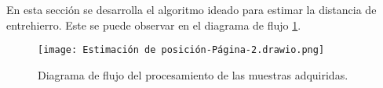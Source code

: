 En esta sección se desarrolla el algoritmo ideado para estimar la distancia de entrehierro. Este se puede observar en el diagrama de flujo \ref{fig:procesamiento-muestras-adquiridas}.


\begin{figure}[H]
	\centering
	\texttt{[image: Estimación de posición-Página-2.drawio.png]}
	\caption{ Diagrama de flujo del procesamiento de las muestras adquiridas.}
	\label{fig:procesamiento-muestras-adquiridas}
\end{figure}

%
%
%
%

